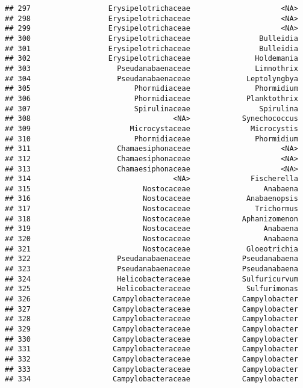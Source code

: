 \documentclass[
]{article}
\begin{document}
\begin{verbatim}
## 297                  Erysipelotrichaceae                     <NA>
## 298                  Erysipelotrichaceae                     <NA>
## 299                  Erysipelotrichaceae                     <NA>
## 300                  Erysipelotrichaceae                Bulleidia
## 301                  Erysipelotrichaceae                Bulleidia
## 302                  Erysipelotrichaceae               Holdemania
## 303                    Pseudanabaenaceae               Limnothrix
## 304                    Pseudanabaenaceae             Leptolyngbya
## 305                        Phormidiaceae               Phormidium
## 306                        Phormidiaceae             Planktothrix
## 307                        Spirulinaceae                Spirulina
## 308                                 <NA>            Synechococcus
## 309                       Microcystaceae              Microcystis
## 310                        Phormidiaceae               Phormidium
## 311                    Chamaesiphonaceae                     <NA>
## 312                    Chamaesiphonaceae                     <NA>
## 313                    Chamaesiphonaceae                     <NA>
## 314                                 <NA>              Fischerella
## 315                          Nostocaceae                 Anabaena
## 316                          Nostocaceae             Anabaenopsis
## 317                          Nostocaceae               Trichormus
## 318                          Nostocaceae            Aphanizomenon
## 319                          Nostocaceae                 Anabaena
## 320                          Nostocaceae                 Anabaena
## 321                          Nostocaceae             Gloeotrichia
## 322                    Pseudanabaenaceae            Pseudanabaena
## 323                    Pseudanabaenaceae            Pseudanabaena
## 324                    Helicobacteraceae            Sulfuricurvum
## 325                    Helicobacteraceae             Sulfurimonas
## 326                   Campylobacteraceae            Campylobacter
## 327                   Campylobacteraceae            Campylobacter
## 328                   Campylobacteraceae            Campylobacter
## 329                   Campylobacteraceae            Campylobacter
## 330                   Campylobacteraceae            Campylobacter
## 331                   Campylobacteraceae            Campylobacter
## 332                   Campylobacteraceae            Campylobacter
## 333                   Campylobacteraceae            Campylobacter
## 334                   Campylobacteraceae            Campylobacter

\end{verbatim}
\end{document}
